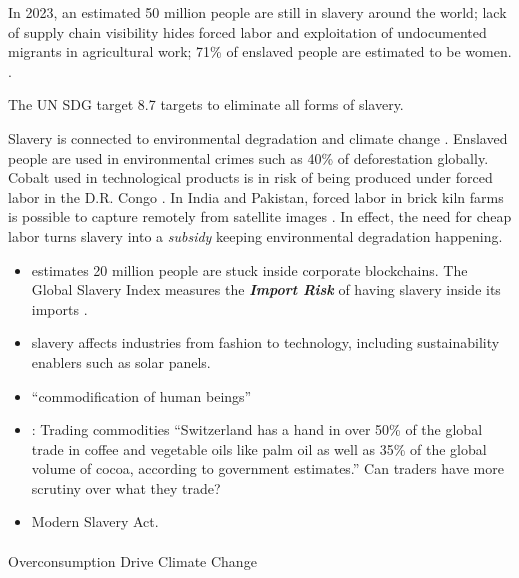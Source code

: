 \documentclass[
  letterpaper,
  DIV=11,
  numbers=noendperiod]{scrartcl}
\makeatletter
\let\oldparagraph\paragraph
\renewcommand{\paragraph}{
    \@ifstar
      \xxxParagraphStar
      \xxxParagraphNoStar
  }
\newcommand{\xxxParagraphStar}[1]{\oldparagraph*{#1}\mbox{}}
\newcommand{\xxxParagraphNoStar}[1]{\oldparagraph{#1}\mbox{}}
\makeatother
\begin{document}
In 2023, an estimated 50 million people are still in slavery around the
world; lack of supply chain visibility hides forced labor and
exploitation of undocumented migrants in agricultural work; 71\% of
enslaved people are estimated to be women.
\citep{kunzAdoptionTransferabilityJoint2023, borrelliCareSupportMaternity2023}.

The UN SDG target 8.7 targets to eliminate all forms of slavery.

Slavery is connected to environmental degradation and climate change
\citep{deckersparksGrowingEvidenceInterconnections2021}. Enslaved people
are used in environmental crimes such as 40\% of deforestation globally.
Cobalt used in technological products is in risk of being produced under
forced labor in the D.R. Congo
\citep{sovacoolWhenSubterraneanSlavery2021}. In India and Pakistan,
forced labor in brick kiln farms is possible to capture remotely from
satellite images \citep{boydSlaverySpaceDemonstrating2018}. In effect,
the need for cheap labor turns slavery into a \emph{subsidy} keeping
environmental degradation happening.

\begin{itemize}
\item
  \citet{christBlockchainTechnologyModern2021} estimates 20 million
  people are stuck inside corporate blockchains. The Global Slavery
  Index measures the \textbf{\emph{Import Risk}} of having slavery
  inside its imports \citet{walkfreeGlobalSlaveryIndex2023}.
\item
  \citet{hansvanleeuwenModernSlaveryGrace2023} slavery affects
  industries from fashion to technology, including sustainability
  enablers such as solar panels.
\item
  ``commodification of human beings''
\item
  \citet{anandchandrasekharWhySwitzerlandMatters2021}: Trading
  commodities ``Switzerland has a hand in over 50\% of the global trade
  in coffee and vegetable oils like palm oil as well as 35\% of the
  global volume of cocoa, according to government estimates.'' Can
  traders have more scrutiny over what they trade?
\item
  Modern Slavery Act.
\end{itemize}

\paragraph{Overconsumption Drive Climate
Change}\label{overconsumption-drive-climate-change}
\end{document}
